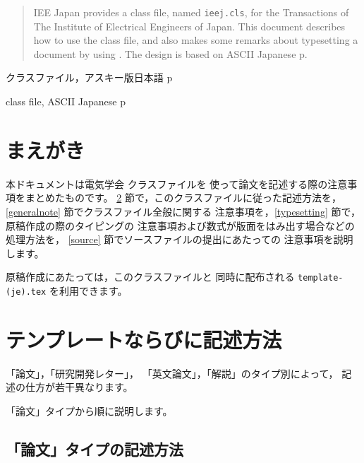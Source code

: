 \documentclass[fleqn]{ieej}
\def\ClassFile{\texttt{ieej.cls}}
\begin{document}
\begin{abstract}
IEE Japan provides a \LaTeXe{} class file, named \ClassFile, 
for the Transactions of The Institute of Electrical Engineers of Japan. 
This document describes how to use the class file, 
and also makes some remarks about typesetting a document by using \LaTeXe.
The design is based on ASCII Japanese p\LaTeXe. 
\end{abstract}
\begin{jkeyword}
クラスファイル，アスキー版日本語 p\LaTeXe
\end{jkeyword}
\begin{ekeyword}
class file, ASCII Japanese p\LaTeXe
\end{ekeyword}
\maketitle

\section{まえがき}\label{sec:intro}

本ドキュメントは電気学会 \LaTeXe{} クラスファイルを
使って論文を記述する際の注意事項をまとめたものです。
\ref{template} 節で，このクラスファイルに従った記述方法を，
\ref{generalnote} 節でクラスファイル全般に関する
注意事項を，\ref{typesetting} 節で，原稿作成の際のタイピングの
注意事項および数式が版面をはみ出す場合などの処理方法を，
\ref{source} 節でソースファイルの提出にあたっての
注意事項を説明します。

原稿作成にあたっては，このクラスファイルと
同時に配布される \texttt{template-(je).tex} を利用できます。


\section{テンプレートならびに記述方法}\label{template}

「論文」，「研究開発レター」，
「英文論文」，「解説」のタイプ別によって，
記述の仕方が若干異なります。

「論文」タイプから順に説明します。

\subsection{「論文」タイプの記述方法}
\end{document}
